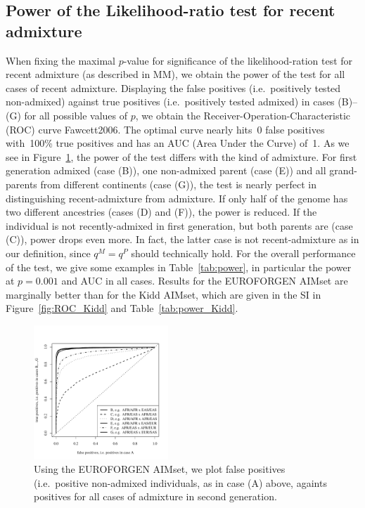 \documentclass[12pt]{article}
\theoremstyle{definition}
\begin{document}
\subsection{Power of the Likelihood-ratio test for recent admixture}
When fixing the maximal $p$-value for significance of the
likelihood-ration test for recent admixture (as described in MM), we
obtain the power of the test for all cases of recent
admixture. Displaying the false positives (i.e.\ positively tested
non-admixed) against true positives (i.e.\ positively tested admixed)
in cases (B)--(G) for all possible values of $p$, we obtain the
Receiver-Operation-Characteristic (ROC) curve \cite{article}{Fawcett2006}. The
optimal curve nearly hits~0 false positives with~100\% true positives
and has an AUC (Area Under the Curve) of~1. As we see in
Figure~\ref{fig:ROC_EUROFORGEN}, the power of the test differs with
the kind of admixture. For first generation admixed (case (B)), one
non-admixed parent (case (E)) and all grand-parents from different
continents (case (G)), the test is nearly perfect in distinguishing
recent-admixture from admixture. If only half of the genome has two
different ancestries (cases (D) and (F)), the power is reduced. If the
individual is not recently-admixed in first generation, but both
parents are (case (C)), power drops even more. In fact, the latter
case is not recent-admixture as in our definition, since $q^M = q^P$
should technically hold. For the overall performance of the test, we
give some examples in Table~\ref{tab:power}, in particular the power
at $p=0.001$ and AUC in all cases. Results for the EUROFORGEN AIMset
are marginally better than for the Kidd AIMset, which are given in the
SI in Figure~\ref{fig:ROC_Kidd} and Table~\ref{tab:power_Kidd}.

\begin{figure}[htb]
  \begin{center}
    \includegraphics[width=0.45\textwidth]{roc-curve-EUROFORGENE.pdf}
  \end{center}
  \caption{Using the EUROFORGEN AIMset, we plot false positives (i.e.\
    positive non-admixed individuals, as in case (A) above, againts
    positives for all cases of admixture in second generation.}
  \label{fig:ROC_EUROFORGEN}
\end{figure}
\end{document}
